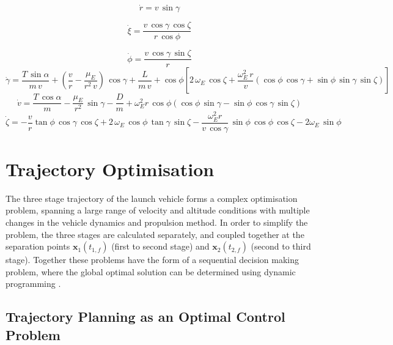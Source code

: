 \documentclass[]{aiaa-tc}
\begin{document}
\begin{equation}
\dot{r} = v \, \sin \gamma
\end{equation}

\begin{equation}
\dot{\xi} = \frac{v \, \cos \gamma \, \cos \zeta}{r \, \cos \phi}
\end{equation}

\begin{equation}
\dot{\phi} = \frac{v\,\cos\gamma\,\sin\zeta}{r}
\end{equation}
\begin{equation}
\dot{\gamma} = \frac{T\,\sin\alpha}{m\,v}+ (\frac{v}{r}-\frac{\mu_E}{r^2 \,v})\,\cos\gamma + \frac{L}{m\,v}
 + \cos\phi[2\,\omega_E\, \cos\zeta + \frac{\omega_E^2\, r}{v}(\cos\phi\,\cos\gamma+\sin\phi\,\sin\gamma\,\sin\zeta)]
 \end{equation}
\begin{equation}
\dot{v} = \frac{T\,\cos\alpha}{m}-\frac{\mu_E}{r^2}\,\sin\gamma - \frac{D}{m}
+ \omega_E^2 r\,\cos\phi(\cos\phi\,\sin\gamma-\sin\phi\,\cos\gamma\,\sin\zeta)
\end{equation}
\begin{equation}
\dot{\zeta} = -\frac{v}{r}\tan\phi\,\cos\gamma\,\cos\zeta +2\,\omega_E\,\cos\phi\,\tan\gamma\,\sin\zeta - \frac{\omega_E^2 r}{v\,\cos\gamma}\,\sin\phi \, \cos\phi\,\cos\zeta-2\omega_E\,\sin\phi 
\end{equation}


\section{Trajectory Optimisation} \label{section:optimisation}

The three stage trajectory of the launch vehicle forms a complex optimisation problem, spanning a large range of velocity and altitude conditions with multiple changes in the vehicle dynamics and propulsion method. In order to simplify the problem, the three stages are calculated separately, and coupled together at the separation points $\textbf{x}_1(t_{1,f})$ (first to second stage) and  $\textbf{x}_2(t_{2,f})$ (second to third stage). Together these problems have the form of a sequential decision making problem, where the global optimal solution can be determined using dynamic programming \cite{Bertsekas2005}. 



\subsection{Trajectory Planning as an Optimal Control Problem}
\end{document}
